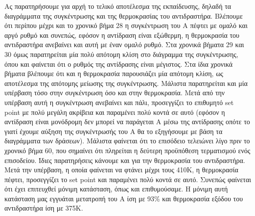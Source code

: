 \documentclass[11pt]{article} %
\numberwithin{equation}{subsection}
\begin{document}
Ας παρατηρήσουμε για αρχή το τελικό αποτέλεσμα της εκπαίδευσης, δηλαδή τα διαγράμματα της συγκέντρωσης και της θερμοκρασίας του αντιδραστήρα. Βλέπουμε ότι περίπου μέχρι και το χρονικό βήμα 28 η συγκέντρωση του Α πέφτει με ομαλό και αργό ρυθμό και συνεπώς, εφόσον η αντίδραση είναι εξώθερμη, η θερμοκρασία του αντιδραστήρα ανεβαίνει και αυτή με έναν ομαλό ρυθμό. Στα χρονικά βήματα 29 και 30 όμως παρατηρείται μία πολύ απότομη κλίση στο διάγραμμα της συγκέντρωσης, όπου και φαίνεται ότι ο ρυθμός της αντίδρασης είναι μέγιστος. Στα ίδια χρονικά βήματα βλέπουμε ότι και η θερμοκρασία παρουσιάζει μία απότομη κλίση, ως αποτέλεσμα της απότομης μείωσης της συγκέντρωσης. Μάλιστα παρατηρείται και μία υπέρβαση τόσο στην συγκέντρωση όσο και στην θερμοκρασία. Μετά από την υπέρβαση αυτή η συγκέντρωση ανεβαίνει και πάλι, προσεγγίζει το επιθυμητό set point με πολύ μεγάλη ακρίβεια και παραμένει πολύ κοντά σε αυτό (εφόσον η αντίδραση είναι μονόδρομη δεν μπορεί να παράγεται Α μέσω της αντίδρασης οπότε το γιατί έχουμε αύξηση της συγκέντρωσής του Α θα το εξηγήσουμε με βάση τα διαγράμματα των δράσεων). Μάλιστα φαίνεται ότι το επισόδειο τελειώνει λίγο πριν το χρονικό βήμα 60, που σημαίνει ότι πληρείται η δεύτερη προϋπόθεση τερματισμού ενός επισοδείου. Ίδιες παρατηρήσεις κάνουμε και για την θερμοκρασία του αντιδραστήρα. Μετά την υπέρβαση, η οποία φαίνεται να φτάνει μέχρι τους 410Κ, η θερμοκρασία πέφτει, προσεγγίζει το set point και παραμένει πολύ κοντά σε αυτό. Συνεπώς φαίνεται ότι έχει επιτευχθεί μόνιμη κατάσταση, όπως και επιθυμούσαμε. Η μόνιμη αυτή κατάσταση μας εγγυάται μετατροπή του Α ίση με 93\% και θερμοκρασία εξόδου του αντιδραστήρα ίση με 375K.\\
\end{document}
